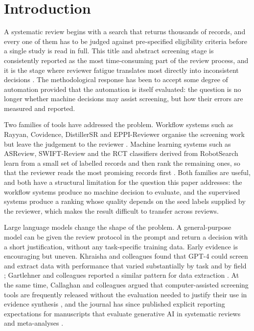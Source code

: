 \section{Introduction}\label{sec:intro}

A systematic review begins with a search that returns thousands of records, and
every one of them has to be judged against pre-specified eligibility criteria
before a single study is read in full. This title and abstract screening stage
is consistently reported as the most time-consuming part of the review
process, and it is the stage where reviewer fatigue translates most directly
into inconsistent decisions \autocite{Tsafnat_2014}. The methodological
response has been to accept some degree of automation provided that the
automation is itself evaluated: the question is no longer whether machine
decisions may assist screening, but how their errors are measured and
reported.

Two families of tools have addressed the problem. Workflow systems such as
Rayyan, Covidence, DistillerSR and EPPI-Reviewer organise the screening work
but leave the judgement to the reviewer
\autocite{Ouzzani_2016,Marshall_2019}. Machine learning systems such as
ASReview, SWIFT-Review and the RCT classifiers derived from RobotSearch learn
from a small set of labelled records and then rank the remaining ones, so that
the reviewer reads the most promising records first
\autocite{van_de_Schoot_2021,Howard_2016}. Both families are useful, and both
have a structural limitation for the question this paper addresses: the
workflow systems produce no machine decision to evaluate, and the supervised
systems produce a ranking whose quality depends on the seed labels supplied by
the reviewer, which makes the result difficult to transfer across reviews.

Large language models change the shape of the problem. A general-purpose model
can be given the review protocol in the prompt and return a decision with a
short justification, without any task-specific training data. Early evidence
is encouraging but uneven. Khraisha and colleagues found that GPT-4 could
screen and extract data with performance that varied substantially by task and
by field \autocite{Khraisha_2024}; Gartlehner and colleagues reported a
similar pattern for data extraction \autocite{Gartlehner_2024}. At the same
time, Callaghan and colleagues argued that computer-assisted screening tools
are frequently released without the evaluation needed to justify their use in
evidence synthesis \autocite{Callaghan_2024}, and the journal has since
published explicit reporting expectations for manuscripts that evaluate
generative AI in systematic reviews and meta-analyses
\autocite{Farotimi_2025}.

